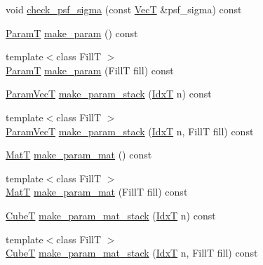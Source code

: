 \begin{DoxyCompactItemize}
\item 
void \hyperlink{classmappel_1_1PointEmitterModel_a85780ca544a5ef5e0a62e74005081677}{check\+\_\+psf\+\_\+sigma} (const \hyperlink{namespacemappel_a2225ad69f358daa3f4f99282a35b9a3a}{VecT} \&psf\+\_\+sigma) const 
\item 
\hyperlink{classmappel_1_1PointEmitterModel_a665ec6aea3aac139bb69a23c06d4b9a1}{ParamT} \hyperlink{classmappel_1_1PointEmitterModel_a1cd8ff64ce4132b6eaa8655696885749}{make\+\_\+param} () const 
\item 
{\footnotesize template$<$class FillT $>$ }\\\hyperlink{classmappel_1_1PointEmitterModel_a665ec6aea3aac139bb69a23c06d4b9a1}{ParamT} \hyperlink{classmappel_1_1PointEmitterModel_a5638e3df26cf84d7cf0f23112132682e}{make\+\_\+param} (FillT fill) const 
\item 
\hyperlink{classmappel_1_1PointEmitterModel_add253b568d763f1513a810aac35de719}{Param\+VecT} \hyperlink{classmappel_1_1PointEmitterModel_a6c7edc7f2549058df66472cd7647cf9b}{make\+\_\+param\+\_\+stack} (\hyperlink{namespacemappel_ab17ec0f30b61ece292439d7ece81d3a8}{IdxT} n) const 
\item 
{\footnotesize template$<$class FillT $>$ }\\\hyperlink{classmappel_1_1PointEmitterModel_add253b568d763f1513a810aac35de719}{Param\+VecT} \hyperlink{classmappel_1_1PointEmitterModel_abab975b04e09e6336a930b6d8fd8c267}{make\+\_\+param\+\_\+stack} (\hyperlink{namespacemappel_ab17ec0f30b61ece292439d7ece81d3a8}{IdxT} n, FillT fill) const 
\item 
\hyperlink{namespacemappel_a7091ab87c528041f7e2027195fad8915}{MatT} \hyperlink{classmappel_1_1PointEmitterModel_a8ede9fe8e3b6a3e621c2da72e23c7f9d}{make\+\_\+param\+\_\+mat} () const 
\item 
{\footnotesize template$<$class FillT $>$ }\\\hyperlink{namespacemappel_a7091ab87c528041f7e2027195fad8915}{MatT} \hyperlink{classmappel_1_1PointEmitterModel_a68a9c537f2f2725eb8fb9d3e250dd84b}{make\+\_\+param\+\_\+mat} (FillT fill) const 
\item 
\hyperlink{namespacemappel_ab2afab4e6c8805e83946670d882768c2}{CubeT} \hyperlink{classmappel_1_1PointEmitterModel_a57b98d5f8b2b5ed2c455bbf76b632f87}{make\+\_\+param\+\_\+mat\+\_\+stack} (\hyperlink{namespacemappel_ab17ec0f30b61ece292439d7ece81d3a8}{IdxT} n) const 
\item 
{\footnotesize template$<$class FillT $>$ }\\\hyperlink{namespacemappel_ab2afab4e6c8805e83946670d882768c2}{CubeT} \hyperlink{classmappel_1_1PointEmitterModel_a2c11fa045187c7ea9ba382141b5d53c1}{make\+\_\+param\+\_\+mat\+\_\+stack} (\hyperlink{namespacemappel_ab17ec0f30b61ece292439d7ece81d3a8}{IdxT} n, FillT fill) const 

\end{DoxyCompactItemize}
